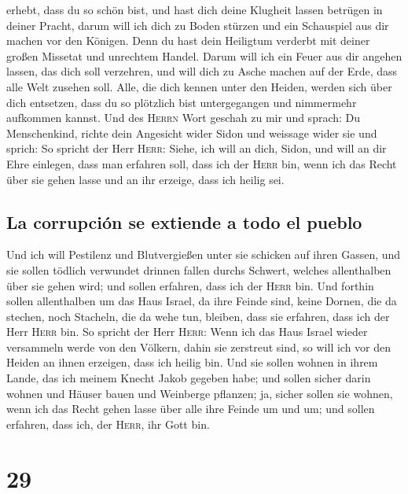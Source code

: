erhebt, dass du so schön bist, und hast dich deine Klugheit lassen
betrügen in deiner Pracht, darum will ich dich zu Boden stürzen und ein
Schauspiel aus dir machen vor den Königen.  Denn du hast
dein Heiligtum verderbt mit deiner großen Missetat und unrechtem Handel.
Darum will ich ein Feuer aus dir angehen lassen, das dich soll
verzehren, und will dich zu Asche machen auf der Erde, dass alle Welt
zusehen soll.  Alle, die dich kennen unter den Heiden,
werden sich über dich entsetzen, dass du so plötzlich bist untergegangen
und nimmermehr aufkommen kannst.  Und des \textsc{Herrn}
Wort geschah zu mir und sprach:  Du Menschenkind, richte
dein Angesicht wider Sidon und weissage wider sie  und
sprich: So spricht der Herr \textsc{Herr}: Siehe, ich will an dich,
Sidon, und will an dir Ehre einlegen, dass man erfahren soll, dass ich
der \textsc{Herr} bin, wenn ich das Recht über sie gehen lasse und an
ihr erzeige, dass ich heilig sei.

\hypertarget{la-corrupciuxf3n-se-extiende-a-todo-el-pueblo}{%
\subsection{La corrupción se extiende a todo el
pueblo}\label{la-corrupciuxf3n-se-extiende-a-todo-el-pueblo}}

 Und ich will Pestilenz und Blutvergießen unter sie
schicken auf ihren Gassen, und sie sollen tödlich verwundet drinnen
fallen durchs Schwert, welches allenthalben über sie gehen wird; und
sollen erfahren, dass ich der \textsc{Herr} bin.  Und
forthin sollen allenthalben um das Haus Israel, da ihre Feinde sind,
keine Dornen, die da stechen, noch Stacheln, die da wehe tun, bleiben,
dass sie erfahren, dass ich der Herr \textsc{Herr} bin. 
So spricht der Herr \textsc{Herr}: Wenn ich das Haus Israel wieder
versammeln werde von den Völkern, dahin sie zerstreut sind, so will ich
vor den Heiden an ihnen erzeigen, dass ich heilig bin. Und sie sollen
wohnen in ihrem Lande, das ich meinem Knecht Jakob gegeben habe;
 und sollen sicher darin wohnen und Häuser bauen und
Weinberge pflanzen; ja, sicher sollen sie wohnen, wenn ich das Recht
gehen lasse über alle ihre Feinde um und um; und sollen erfahren, dass
ich, der \textsc{Herr}, ihr Gott bin.

\hypertarget{section-28}{%
\section{29}\label{section-28}}

